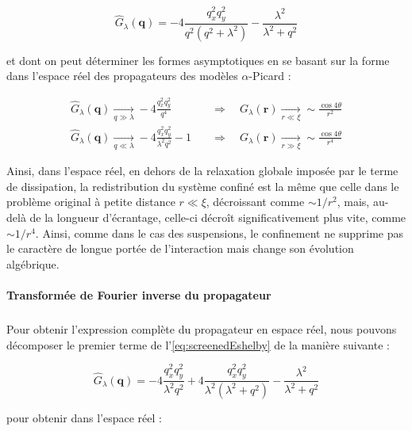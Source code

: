 \begin{equation}
    \hat{G}_\lambda(\mathbf{q}) = -4\frac{q_x^2q_y^2}{q^2(q^2+\lambda^2)}-\frac{\lambda^2}{\lambda^2+q^2}
    \label{eq:screenedEshelby}
\end{equation}

\noindent et dont on peut déterminer les formes asymptotiques en se basant sur la forme dans l'espace réel des propagateurs des modèles $\alpha$-Picard :

\begin{equation}
\begin{aligned}
    \hat{G}_\lambda(\mathbf{q})\xrightarrow[q\gg \lambda]{}-4\frac{q_x^2q_y^2}{q^4} \quad &\Rightarrow \quad G_\lambda(\mathbf{r})\xrightarrow[r\ll \xi]{}\sim\frac{\cos 4\theta}{r^2}\\
    \hat{G}_\lambda(\mathbf{q})\xrightarrow[q \ll \lambda]{}-4\frac{q_x^2q_y^2}{\lambda^2 q^2}-1 \quad &\Rightarrow \quad G_\lambda(\mathbf{r})\xrightarrow[r \gg \xi]{}\sim\frac{\cos 4\theta}{r^4}
\end{aligned}
\end{equation}

\noindent Ainsi, dans l'espace réel, en dehors de la relaxation globale imposée par le terme de dissipation, la redistribution du système confiné est la même que celle dans le problème original à petite distance $r\ll \xi$, décroissant comme $\sim 1/r^2$, mais, au-delà de la longueur d'écrantage, celle-ci décroît significativement plus vite, comme $\sim 1/r^4$. Ainsi, comme dans le cas des suspensions, le confinement ne supprime pas le caractère de longue portée de l'interaction mais change son évolution algébrique.

\paragraph{Transformée de Fourier inverse du propagateur}

\subparagraph{}Pour obtenir l'expression complète du propagateur en espace réel, nous pouvons décomposer le premier terme de l'\autoref{eq:screenedEshelby} de la manière suivante :

\begin{equation}
    \hat{G}_\lambda(\mathbf{q}) = -4\frac{q_x^2q_y^2}{\lambda^2 q^2} + 4\frac{q_x^2q_y^2}{\lambda^2 (\lambda^2 + q^2)}-\frac{\lambda^2}{\lambda^2+q^2}
\end{equation}

\noindent pour obtenir dans l'espace réel :


